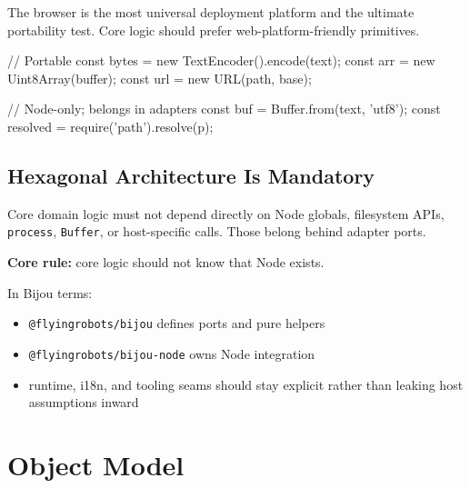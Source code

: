 The browser is the most universal deployment platform and the ultimate portability test. Core logic should prefer web-platform-friendly primitives.

\begin{CodeBlock}
// Portable
const bytes = new TextEncoder().encode(text);
const arr = new Uint8Array(buffer);
const url = new URL(path, base);

// Node-only; belongs in adapters
const buf = Buffer.from(text, 'utf8');
const resolved = require('path').resolve(p);
\end{CodeBlock}

\subsection{Hexagonal Architecture Is Mandatory}\label{record-060-hexagonal-architecture-is-mandatory}

Core domain logic must not depend directly on Node globals, filesystem APIs, \texttt{p\allowbreak{}r\allowbreak{}o\allowbreak{}c\allowbreak{}e\allowbreak{}s\allowbreak{}s}, \texttt{B\allowbreak{}u\allowbreak{}f\allowbreak{}f\allowbreak{}e\allowbreak{}r}, or host-specific calls. Those belong behind adapter ports.

\textbf{Core rule:} core logic should not know that Node exists.

In Bijou terms:

\begin{itemize}
\tightlist
\item
  \texttt{@\allowbreak{}f\allowbreak{}l\allowbreak{}y\allowbreak{}i\allowbreak{}n\allowbreak{}g\allowbreak{}r\allowbreak{}o\allowbreak{}b\allowbreak{}o\allowbreak{}t\allowbreak{}s\allowbreak{}/\allowbreak{}b\allowbreak{}i\allowbreak{}j\allowbreak{}o\allowbreak{}u} defines ports and pure helpers
\item
  \texttt{@\allowbreak{}f\allowbreak{}l\allowbreak{}y\allowbreak{}i\allowbreak{}n\allowbreak{}g\allowbreak{}r\allowbreak{}o\allowbreak{}b\allowbreak{}o\allowbreak{}t\allowbreak{}s\allowbreak{}/\allowbreak{}b\allowbreak{}i\allowbreak{}j\allowbreak{}o\allowbreak{}u\allowbreak{}-\allowbreak{}n\allowbreak{}o\allowbreak{}d\allowbreak{}e} owns Node integration
\item
  runtime, i18n, and tooling seams should stay explicit rather than leaking host assumptions inward
\end{itemize}

\section{Object Model}\label{record-060-object-model}

